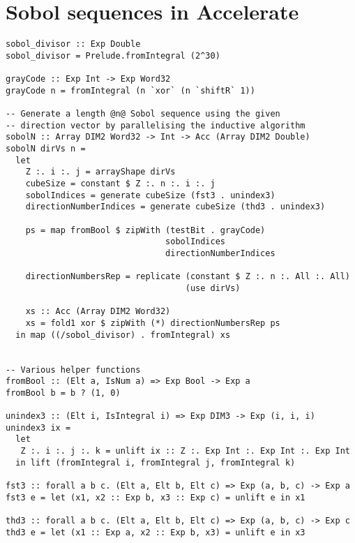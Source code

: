 \chapter{Sobol sequences in Accelerate}
\label{appendix:accelerate-sobol}

\begin{lstlisting}[basicstyle=\footnotesize\ttfamily]sobol_divisor :: Exp Double
sobol_divisor = Prelude.fromIntegral (2^30)

grayCode :: Exp Int -> Exp Word32
grayCode n = fromIntegral (n `xor` (n `shiftR` 1))

-- Generate a length @n@ Sobol sequence using the given
-- direction vector by parallelising the inductive algorithm
sobolN :: Array DIM2 Word32 -> Int -> Acc (Array DIM2 Double)
sobolN dirVs n =
  let
    Z :. i :. j = arrayShape dirVs
    cubeSize = constant $ Z :. n :. i :. j
    sobolIndices = generate cubeSize (fst3 . unindex3)
    directionNumberIndices = generate cubeSize (thd3 . unindex3)

    ps = map fromBool $ zipWith (testBit . grayCode)
                                sobolIndices
                                directionNumberIndices

    directionNumbersRep = replicate (constant $ Z :. n :. All :. All) 
                                    (use dirVs)

    xs :: Acc (Array DIM2 Word32)
    xs = fold1 xor $ zipWith (*) directionNumbersRep ps
  in map ((/sobol_divisor) . fromIntegral) xs


-- Various helper functions
fromBool :: (Elt a, IsNum a) => Exp Bool -> Exp a
fromBool b = b ? (1, 0)

unindex3 :: (Elt i, IsIntegral i) => Exp DIM3 -> Exp (i, i, i)
unindex3 ix =
  let
   Z :. i :. j :. k = unlift ix :: Z :. Exp Int :. Exp Int :. Exp Int
  in lift (fromIntegral i, fromIntegral j, fromIntegral k)

fst3 :: forall a b c. (Elt a, Elt b, Elt c) => Exp (a, b, c) -> Exp a
fst3 e = let (x1, x2 :: Exp b, x3 :: Exp c) = unlift e in x1

thd3 :: forall a b c. (Elt a, Elt b, Elt c) => Exp (a, b, c) -> Exp c
thd3 e = let (x1 :: Exp a, x2 :: Exp b, x3) = unlift e in x3
\end{lstlisting}

